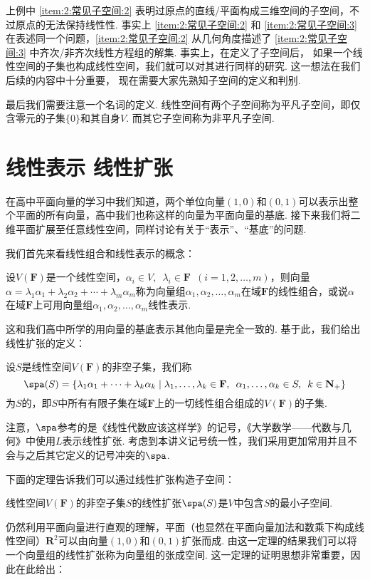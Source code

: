 上例中 \ref*{item:2:常见子空间:2} 表明过原点的直线/平面构成三维空间的子空间，不过原点的无法保持线性性. 事实上 \ref*{item:2:常见子空间:2} 和 \ref*{item:2:常见子空间:3} 在表述同一个问题，\ref*{item:2:常见子空间:2} 从几何角度描述了 \ref*{item:2:常见子空间:3} 中齐次/非齐次线性方程组的解集. 事实上，在定义了子空间后， 如果一个线性空间的子集也构成线性空间，我们就可以对其进行同样的研究. 这一想法在我们后续的内容中十分重要， 现在需要大家先熟知子空间的定义和判别.

最后我们需要注意一个名词的定义. 线性空间有两个子空间称为平凡子空间，即仅含零元的子集$\{0\}$和其自身$V$. 而其它子空间称为非平凡子空间.

\section{线性表示 \quad 线性扩张}

在高中平面向量的学习中我们知道，两个单位向量$(1,0)$和$(0,1)$可以表示出整个平面的所有向量，高中我们也称这样的向量为平面向量的基底. 接下来我们将二维平面扩展至任意线性空间，同样讨论有关于``表示''、``基底''的问题.

我们首先来看线性组合和线性表示的概念：
\begin{definition}
    设$V(\mathbf{F})$是一个线性空间，$\alpha_i\in V,\enspace\lambda_i\in \mathbf{F}\enspace(i=1,2,\ldots,m)$，则向量$\alpha=\lambda_1\alpha_1+\lambda_2\alpha_2+\cdots+\lambda_m\alpha_m$称为向量组$\alpha_1,\alpha_2,\ldots,\alpha_m$在域$\mathbf{F}$的线性组合，或说$\alpha$在域$\mathbf{F}$上可用向量组$\alpha_1,\alpha_2,\ldots,\alpha_m$线性表示.
\end{definition}
这和我们高中所学的用向量的基底表示其他向量是完全一致的. 基于此，我们给出线性扩张的定义：
\begin{definition}[线性扩张] 
    设$S$是线性空间$V(\mathbf{F})$的非空子集，我们称
    \[ \spa(S)=\{\lambda_1\alpha_1+\cdots+\lambda_k\alpha_k \mid \lambda_1,\ldots,\lambda_k\in\mathbf{F},\enspace\alpha_1,\ldots,\alpha_k\in S,\enspace k\in\mathbf{N}_+\} \]
    为$S$的，即$S$中所有有限子集在域$\mathbf{F}$上的一切线性组合组成的$V(\mathbf{F})$的子集.
\end{definition}
注意，$\spa$参考的是《线性代数应该这样学》的记号，《大学数学——代数与几何》中使用$L$表示线性扩张. 考虑到本讲义记号统一性，我们采用更加常用并且不会与之后其它定义的记号冲突的$\spa$.

下面的定理告诉我们可以通过线性扩张构造子空间：
\begin{theorem}\label{thm:2:线性扩张构造子空间}
    线性空间$V(\mathbf{F})$的非空子集$S$的线性扩张$\spa(S)$是$V$中包含$S$的最小子空间.
\end{theorem}
仍然利用平面向量进行直观的理解，平面（也显然在平面向量加法和数乘下构成线性空间）$\mathbf{R}^2$可以由向量$(1,0)$和$(0,1)$扩张而成. 由这一定理的结果我们可以将一个向量组的线性扩张称为向量组的张成空间. 这一定理的证明思想非常重要，因此在此给出：


